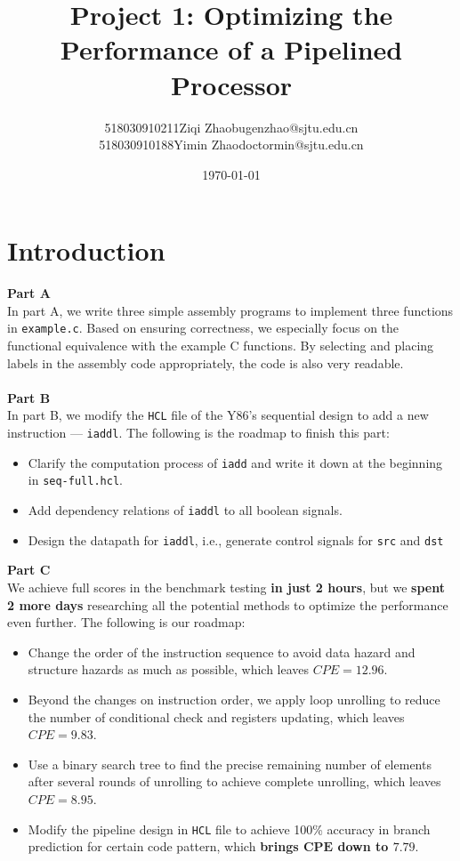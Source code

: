 \documentclass[12pt,a4paper]{article}
\title{\textbf{Project 1: Optimizing the Performance of a Pipelined Processor}} %
\author{518030910211\quad Ziqi Zhao\quad bugenzhao@sjtu.edu.cn \\
        518030910188\quad Yimin Zhao\quad doctormin@sjtu.edu.cn \\ } %
\date{\today} %
\begin{document}
\maketitle %

\section{Introduction}
\textbf{Part A}
\\
In part A, we write three simple assembly programs to implement three functions in \texttt{example.c}. 
Based on ensuring correctness, we especially focus on the functional equivalence with the example C functions. 
By selecting and placing labels in the assembly code appropriately, the code is also very readable.\\ \\
\textbf{Part B}
\\
In part B, we modify the \texttt{HCL} file of the Y86's sequential design to add a new instruction --- \texttt{iaddl}. 
The following is the roadmap to finish this part:
\begin{itemize}
        \item Clarify the computation process of \texttt{iadd} and write it down at the beginning in \texttt{seq-full.hcl}.
        \item Add dependency relations of \texttt{iaddl} to all boolean signals.
        \item Design the datapath for \texttt{iaddl}, i.e., generate control signals for \texttt{src} and \texttt{dst}
\end{itemize}
\textbf{Part C}
\\
We achieve full scores in the benchmark testing \textbf{in just 2 hours}, 
but we \textbf{spent 2 more days} researching all the potential methods to optimize the performance even further. 
The following is our roadmap:
\begin{itemize}
        \item Change the order of the instruction sequence to avoid data hazard and structure hazards as much as possible, which leaves $CPE = 12.96$.
        \item Beyond the changes on instruction order, we apply loop unrolling to reduce the number of conditional check and registers updating, which leaves $CPE = 9.83$.
        \item Use a binary search tree to find the precise remaining number of elements after several rounds of unrolling to achieve complete unrolling, which leaves $CPE = 8.95$.
        \item Modify the pipeline design in \texttt{HCL} file to achieve 100\% accuracy in branch prediction for certain code pattern, which {\color{blue}\textbf{brings $\mathbf{CPE}$ down to $\mathbf{7.79}$}}.
\end{itemize}
\end{document}
